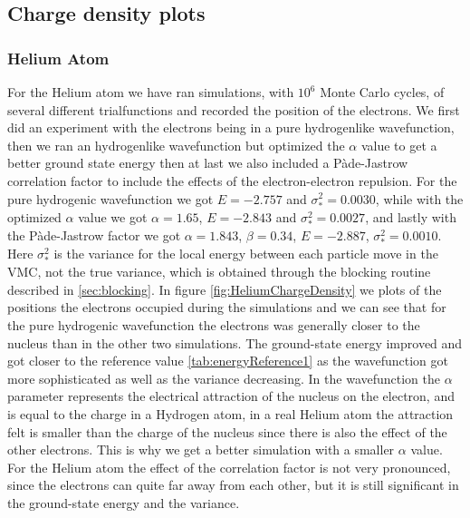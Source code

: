 \subsection{Charge density plots}

	\subsubsection{Helium Atom}
		For the Helium atom we have ran simulations, with \(10^6\) Monte Carlo cycles, of several different trialfunctions and recorded the position of the electrons. We first did an experiment with the electrons being in a pure hydrogenlike wavefunction, then we ran an hydrogenlike wavefunction but optimized the \(\alpha \) value to get a better ground state energy then at last we also included a Pàde-Jastrow correlation factor to include the effects of the electron-electron repulsion. For the pure hydrogenic wavefunction we got $E = -2.757$ and $\sigma^2_* = 0.0030$, while with the optimized \(\alpha\) value we got $\alpha = 1.65$, $E = -2.843$ and $\sigma^2_* = 0.0027$, and lastly with the Pàde-Jastrow factor we got $\alpha = 1.843$, $\beta = 0.34$, $E = -2.887$, $\sigma^2_* = 0.0010$. Here $\sigma^2_*$ is the variance for the local energy between each particle move in the VMC, not the true variance, which is obtained through the blocking routine described in \cref{sec:blocking}. In figure \ref{fig:HeliumChargeDensity} we plots of the positions the electrons occupied during the simulations and we can see that for the pure hydrogenic wavefunction the electrons was generally closer to the nucleus than in the other two simulations. The ground-state energy improved and got closer to the reference value \ref{tab:energyReference1} as the wavefunction got more sophisticated as well as the variance decreasing. In the wavefunction the $\alpha$ parameter represents the electrical attraction of the nucleus on the electron, and is equal to the charge in a Hydrogen atom, in a real Helium atom the attraction felt is smaller than the charge of the nucleus since there is also the effect of the other electrons. This is why we get a better simulation with a smaller \(\alpha\) value. For the Helium atom the effect of the correlation factor is not very pronounced, since the electrons can quite far away from each other, but it is still significant in the ground-state energy and the variance.
